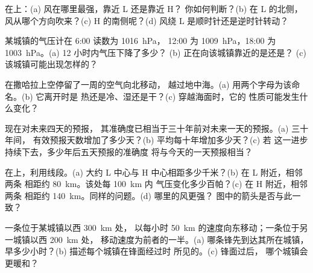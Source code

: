 \begin{exercise}[$\star\star$]\label{exo:g8:fronts-and-weather-maps:7}
在上：(a) 风在哪里最强，靠近 L 还是靠近 H？
你如何判断？(b) 在 L 的北侧，
风从哪个方向吹来？(c) H 的南侧呢？(d) 风绕 L
是顺时针还是逆时针转动？
\end{exercise}

\begin{exercise}[$\star\star$]\label{exo:g8:fronts-and-weather-maps:8}
某城镇的气压计在 6:00 读数为 \qty{1016}{hPa}，
12:00 为 \qty{1009}{hPa}，18:00 为 \qty{1003}{hPa}。(a) 12 小时内气压下降了多少？
(b) 正在向该城镇靠近的是还是？
(c) 该城镇可能出现怎样的？
\end{exercise}

\begin{exercise}[$\star\star$]\label{exo:g8:fronts-and-weather-maps:9}
在撒哈拉上空停留了一周的空气向北移动，
越过地中海。(a) 用两个字母为该命名。(b) 它离开时是
热还是冷、湿还是干？(c) 穿越海面时，它的
性质可能发生什么变化？
\end{exercise}

\begin{exercise}[$\star\star$]\label{exo:g8:fronts-and-weather-maps:10}
现在对未来四天的预报，
其准确度已相当于三十年前对未来一天的预报。(a) 三十年间，
有效预报天数增加了多少天？(b) 平均每十年增加多少天？(c) 若
这一进步持续下去，多少年后五天预报的准确度
将与今天的一天预报相当？
\end{exercise}

\begin{exercise}[$\star\star\star$]\label{exo:g8:fronts-and-weather-maps:11}
在上，利用线段。(a) 大约
L 中心与 H 中心相距多少千米？(b) 在 L 附近，相邻两条
相距约 \qty{80}{km}。该处每 \qty{100}{km} 内
气压变化多少百帕？(c) 在 H 附近，相邻两条
相距约 \qty{140}{km}。同样的问题。(d) 哪里的风更强？
图中的箭头是否与此一致？
\end{exercise}

\begin{exercise}[$\star\star\star$]\label{exo:g8:fronts-and-weather-maps:12}
一条位于某城镇以西 \qty{300}{km} 处，
以每小时 \qty{50}{km} 的速度向东移动；一条位于另一城镇以西 \qty{200}{km} 处，
移动速度为前者的一半。(a) 哪条锋先到达其所在城镇，
早多少小时？(b) 描述每个城镇在锋面经过时
所见的。(c) 锋面过后，
哪个城镇会更暖和？
\end{exercise}

